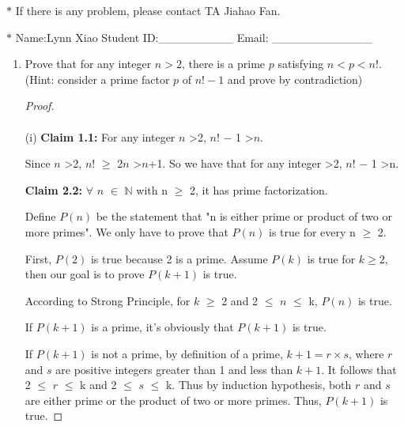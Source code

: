 \documentclass[12pt,a4paper]{article}
\theoremstyle{definition}
\begin{document}
\noindent

\noindent{}
\begin{center}
\footnotesize{\color{red}$*$ If there is any problem, please contact TA Jiahao Fan.}

\footnotesize{\color{blue}$*$ Name:Lynn Xiao  \quad Student ID:\_\_\_\_\_\_\_\_\_ \quad Email: \_\_\_\_\_\_\_\_\_\_\_\_}
\end{center}

\begin{enumerate}
    \item
    Prove that for any integer $n>2$, there is a prime $p$ satisfying $n<p<n!$. {\color{blue}(Hint: consider a prime factor $p$ of $n!-1$ and prove by contradiction)}
	\begin{proof}
~\\
~\\
(i) \textbf{Claim 1.1: }For any integer $n$ \textgreater 2, $n!$ $-$ 1 \textgreater $n$.

Since $n$ \textgreater  2, $n$! $\ge$ 2$n$ \textgreater $n$+1. So we have that for any integer \textgreater 2, $n!$ $-$ 1 \textgreater  n.

\textbf{Claim 2.2:} $\forall$ $n$ $\in$ $\mathbb{N}$ with n $\ge$ 2, it has prime factorization.

Define $P(n)$ be the statement that "n is either prime or product of two or more primes". We only have to prove that $P(n)$ is true for every n $\ge$ 2.

First, $P(2)$ is true because 2 is a prime. Assume $P(k)$ is true for $k \ge 2$, then our goal is to prove $P(k+1)$ is true.

According to Strong Principle, for $k$ $\ge$ 2 and 2 $\le$ $n$ $\le$ k, $P(n)$ is true.

If $P(k+1)$ is a prime, it's obviously that $P(k+1)$ is true.

If $P(k+1)$ is not a prime, by definition of a prime, $k + 1 = r \times s$, where $r$ and $s$ are positive integers greater than 1 and less than $k + 1$. It follows that 2 $\le$ $r$ $\le$ k and 2 $\le$ $s$ $\le$ k. Thus by induction hypothesis, both $r$ and $s$ are either prime or the product of two or more primes. Thus, $P(k+1)$ is true.


\end{proof}
\end{enumerate}
\end{document}
